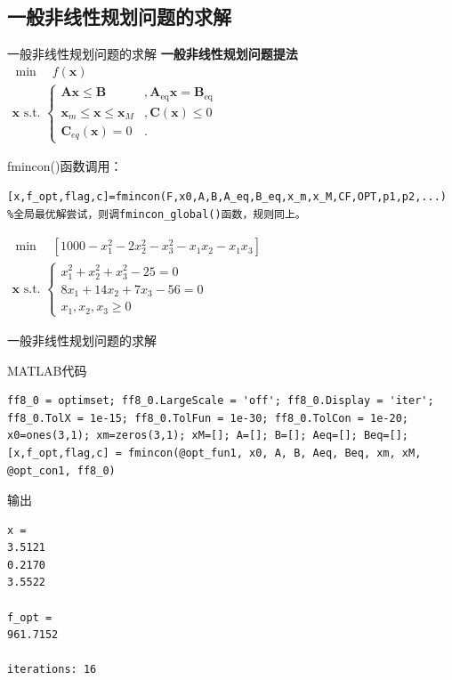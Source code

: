 \documentclass[12pt]{beamer}
\begin{document}
	\subsection{一般非线性规划问题的求解}
\begin{frame}[fragile]{一般非线性规划问题的求解}
\textbf{一般非线性规划问题提法}$
\begin{array}{l}
	\min \quad f(\mathbf{x})\\
	\mathbf{x} \text { s.t. }\left\{\begin{array}{ll}
		\mathbf{A} \mathbf{x} \leqslant \mathbf{B} &, \mathbf{A}_{\mathrm{eq}} \mathbf{x}=\mathbf{B}_{\mathrm{eq}} \\
		\mathbf{x}_{m} \leqslant \mathbf{x} \leqslant \mathbf{x}_{M} &,\mathbf{C}(\mathbf{x}) \leqslant 0 \\
		\mathbf{C}_{eq}(\mathbf{x})= 0 &.
	\end{array}\right.
\end{array}$
	\begin{block}{fmincon()函数调用：}
\begin{lstlisting}
[x,f_opt,flag,c]=fmincon(F,x0,A,B,A_eq,B_eq,x_m,x_M,CF,OPT,p1,p2,...)
%全局最优解尝试，则调fmincon_global()函数，规则同上。
\end{lstlisting}
	\end{block}

\begin{example}[6-19]
$\begin{array}{l}
\min \quad \left[1000-x_{1}^{2}-2 x_{2}^{2}-x_{3}^{2}-x_{1} x_{2}-x_{1} x_{3}\right]\\
\mathbf{x} \text { s.t. }\left\{\begin{array}{l}
x_{1}^{2}+x_{2}^{2}+x_{3}^{2}-25=0 \\
8 x_{1}+14 x_{2}+7 x_{3}-56=0 \\
x_{1}, x_{2}, x_{3} \geqslant 0
\end{array}\right.
\end{array}
$
\end{example}
\end{frame}
\begin{frame}[fragile]{一般非线性规划问题的求解}
	\begin{block}{MATLAB代码}
\begin{lstlisting}
ff8_0 = optimset; ff8_0.LargeScale = 'off'; ff8_0.Display = 'iter';
ff8_0.TolX = 1e-15; ff8_0.TolFun = 1e-30; ff8_0.TolCon = 1e-20; 
x0=ones(3,1); xm=zeros(3,1); xM=[]; A=[]; B=[]; Aeq=[]; Beq=[];
[x,f_opt,flag,c] = fmincon(@opt_fun1, x0, A, B, Aeq, Beq, xm, xM, @opt_con1, ff8_0)
\end{lstlisting}		
	\end{block}	
	
	\begin{block}{输出}
\begin{lstlisting}
x =
3.5121
0.2170
3.5522

f_opt =
961.7152

iterations: 16
\end{lstlisting}		
	\end{block}	

\end{frame}
\end{document}
